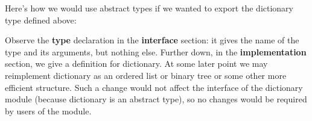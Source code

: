 \documentclass[a4paper,11pt,notitlepage,onecolumn]{book}
\begin{document}
Here's how we would use abstract types if we wanted to export the
\textsf{dictionary} type defined above:
\begin{small}

\begin{ptabular}
\nextline
{}
\nextline
\nextline
{}
\nextline
\nextline
{}
\nextline
{}
\nextline
\nextline
{}
\nextline
{}
\nextline
\nextline
{}
\nextline
\nextline
{}
\nextline
{}
\nextline
\nextline
{}
\nextline
\end{ptabular}

\end{small}
Observe the \textsf{\textbf{type}} declaration in the \textsf{\textbf{interface}} section: it gives the name
of the type and its arguments, but nothing else.  Further down, in the
\textsf{\textbf{implementation}} section, we give a definition for \textsf{dictionary}.  At some
later point we may reimplement \textsf{dictionary} as an ordered list or
binary tree or some other more efficient structure.  Such a change would not
affect the interface of the \textsf{dictionary} module (because \textsf{dictionary} is an
abstract type), so no changes would be required by users of the module.
\end{document}
